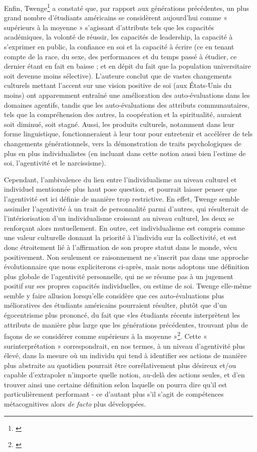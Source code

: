Enfin, Twenge\footnote{\cite{twenge_generational_2012}} a constaté que, par rapport aux générations précédentes, un plus grand nombre d'étudiants américains se considèrent aujourd'hui comme « supérieurs à la moyenne » s'agissant d'attributs tels que les capacités académiques, la volonté de réussir, les capacités de leadership, la capacité à s'exprimer en public, la confiance en soi et la capacité à écrire (ce en tenant compte de la race, du sexe, des performances et du temps passé à étudier, ce dernier étant en fait en baisse ; et en dépit du fait que la population universitaire soit devenue moins sélective). L'auteure conclut que de vastes changements culturels mettant l'accent sur une vision positive de soi (aux États-Unis du moins) ont apparemment entraîné une amélioration des auto-évaluations dans les domaines agentifs, tandis que les auto-évaluations des attributs communautaires, tels que la compréhension des autres, la coopération et la spiritualité, auraient soit diminué, soit stagné. Aussi, les produits culturels, notamment dans leur forme linguistique, fonctionneraient à leur tour pour entretenir et accélérer de tels changements générationnels, vers la démonstration de traits psychologiques de plus en plus individualistes (en incluant dans cette notion aussi bien l'estime de soi, l’agentivité et le narcissisme).

Cependant, l'ambivalence du lien entre l'individualisme au niveau culturel et individuel mentionnée plus haut pose question, et pourrait laisser penser que l’agentivité est ici définie de manière trop restrictive. En effet, Twenge semble assimiler l’agentivité à un trait de personnalité parmi d'autres, qui résulterait de l'intériorisation d'un individualisme croissant au niveau culturel, les deux se renforçant alors mutuellement. En outre, cet individualisme est compris comme une valeur culturelle donnant la priorité à l'individu sur la collectivité, et est donc étroitement lié à l'affirmation de son propre statut dans le monde, vécu positivement. Non seulement ce raisonnement ne s'inscrit pas dans une approche évolutionnaire que nous expliciterons ci-après, mais nous adoptons une définition plus globale de l’agentivité personnelle, qui ne se résume pas à un jugement positif sur ses propres capacités individuelles, ou estime de soi. Twenge elle-même semble y faire allusion lorsqu'elle considère que ces auto-évaluations plus mélioratives des étudiants américains pourraient résulter, plutôt que d'un égocentrisme plus prononcé, du fait que «les étudiants récents interprètent les attributs de manière plus large que les générations précédentes, trouvant plus de façons de se considérer comme supérieurs à la moyenne »\footnote{\cite{dunning_ambiguity_1989}}. Cette « surinterprétation » correspondrait, en nos termes, à un niveau d’agentivité plus élevé, dans la mesure où un individu qui tend à identifier ses actions de manière plus abstraite au quotidien pourrait être corrélativement plus désireux et/ou capable d'extrapoler n'importe quelle notion, au-delà des actions seules, et d'en trouver ainsi une certaine définition selon laquelle on pourra dire qu'il est particulièrement performant - ce d’autant plus s’il s'agit de compétences métacognitives alors \textit{de facto} plus développées.

